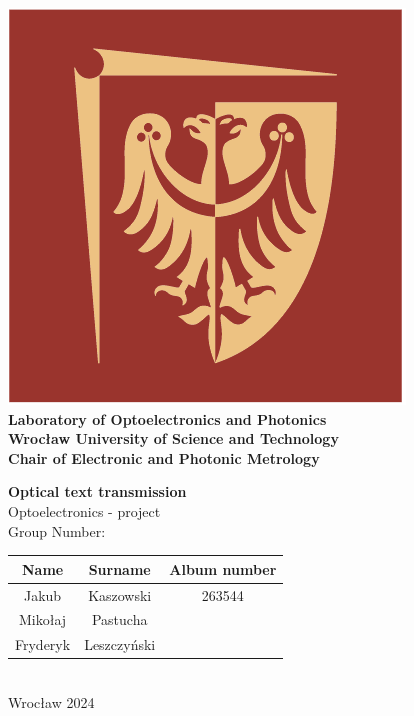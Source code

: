 \documentclass[12pt]{article}
\def\thetitle{Optical text transmission}
\begin{document}
	\begin{titlepage}
		\begin{center}
			\includegraphics[scale=0.3]{img/pwr.png}\\
			\vspace{20pt}
			\textbf{Laboratory of Optoelectronics and Photonics} \\
			\textbf{Wrocław University of Science and Technology} \\
			\textbf{Chair of Electronic and Photonic Metrology}
			
			\vspace{20pt}
		
		\textbf{\huge\thetitle} \\
		\vspace{5pt}
		\Large Optoelectronics - project \\
		\vspace{20pt}
		\normalsize
		Group Number: \\
		
		\begin{tabular}{ |c|c|c| } 
			\hline
			Name & Surname & Album number \\ \hline
			Jakub & Kaszowski & 263544 \\ \hline
			Mikołaj & Pastucha & \\ \hline
			Fryderyk & Leszczyński & \\
			\hline
		\end{tabular} \\
		\vspace{5pt}
		Wrocław 2024 \\
		
		
			
		\end{center}
		
	\end{titlepage}	
\end{document}
